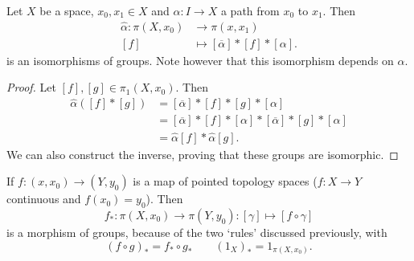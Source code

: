 \begin{theorem}[52.1]
    Let $X$ be a space, $x_0, x_1 \in X$ and $\alpha: I \to X$ a path from  $x_0$ to $x_1$.
    Then
    \begin{align*}
        \hat{\alpha}: \pi(X, x_0) &\longrightarrow\pi(x, x_1)\\
        [f] &\longmapsto  [\overline{\alpha}] * [f] * [\alpha]
    .\end{align*}
    is an isomorphisms of groups. Note however that this isomorphism depends on $\alpha$.
\end{theorem}
\begin{proof}
    Let $[f], [g] \in \pi_1(X, x_0)$.
    Then 
    \begin{align*}
        \hat{\alpha}([f]*[g]) &= [\overline{\alpha}] * [f] * [g] * [\alpha]\\
                              &= [\overline{\alpha}] *[f] * [\alpha] * [\overline{\alpha}] * [g] * [\alpha]\\
                              &= \hat{\alpha}[f] * \hat{\alpha}[g]
    .\end{align*}
    We can also construct the inverse, proving that these groups are isomorphic.
\end{proof}

\begin{remark}
    If $f: (x, x_0) \to (Y, y_0)$ is a map of pointed topology spaces ($f: X \to Y$ continuous and $f(x_0) = y_0$).
    Then \[
        f_*:\pi(X, x_0) \to  \pi(Y, y_0): [\gamma] \mapsto [f  \circ \gamma]
    \]
    is a morphism of groups, because of the two `rules' discussed previously, with
    \[
        (f \circ g)_* = f_*  \circ g_* \qquad (1_X)_* = 1_{\pi(X, x_0)}
    .\] 
\end{remark}
